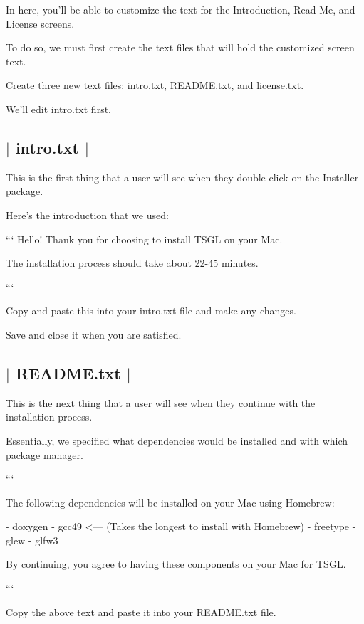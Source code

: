In here, you'll be able to customize the text for the {\ttfamily Introduction}, {\ttfamily Read Me}, and {\ttfamily License} screens.

To do so, we must first create the text files that will hold the customized screen text.

Create three new text files\-: {\ttfamily intro.\-txt}, {\ttfamily R\-E\-A\-D\-M\-E.\-txt}, and {\ttfamily license.\-txt}.

We'll edit {\ttfamily intro.\-txt} first. 

 \subsection*{$\vert$ {\ttfamily intro.\-txt} $\vert$ }

This is the first thing that a user will see when they double-\/click on the Installer package.

Here's the introduction that we used\-:

``` Hello! Thank you for choosing to install T\-S\-G\-L on your Mac.

The installation process should take about 22-\/45 minutes.

```

Copy and paste this into your {\ttfamily intro.\-txt} file and make any changes.

Save and close it when you are satisfied. 

 \subsection*{$\vert$ {\ttfamily R\-E\-A\-D\-M\-E.\-txt} $\vert$ }

This is the next thing that a user will see when they continue with the installation process.

Essentially, we specified what dependencies would be installed and with which package manager.

``` \begin{DoxyVerb}The following dependencies will be installed on your Mac using Homebrew:

    - doxygen
    - gcc49 <--- (Takes the longest to install with Homebrew)
    - freetype
    - glew
    - glfw3

By continuing, you agree to having these components on your Mac for TSGL. 
\end{DoxyVerb}


```

Copy the above text and paste it into your {\ttfamily R\-E\-A\-D\-M\-E.\-txt} file.

